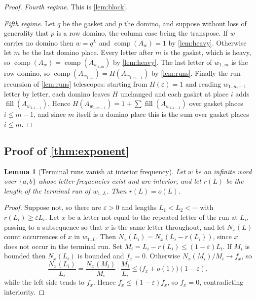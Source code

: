 \documentclass[11pt]{amsart}
\newtheorem{lemma}[theorem]{Lemma}
\theoremstyle{definition}
\theoremstyle{remark}
\DeclareMathOperator{\comp}{comp}
\DeclareMathOperator{\fil}{fill}
\begin{document}
\begin{proof}
\emph{Fourth regime.} This is \cref{lem:block}.

\emph{Fifth regime.} Let $q$ be the gasket and $p$ the domino, and suppose without loss of generality that $p$ is a row domino, the column case being the transpose. If $w$ carries no domino then $w = q^L$ and $\comp(A_w) = 1$ by \cref{lem:heavy}. Otherwise let $m$ be the last domino place. Every letter after $m$ is the gasket, which is heavy, so $\comp(A_w) = \comp(A_{w_{1..m}})$ by \cref{lem:heavy}. The last letter of $w_{1..m}$ is the row domino, so $\comp(A_{w_{1..m}}) = H(A_{w_{1..m-1}})$ by \cref{lem:runs}. Finally the run recursion of \cref{lem:runs} telescopes: starting from $H(\varepsilon) = 1$ and reading $w_{1..m-1}$ letter by letter, each domino leaves $H$ unchanged and each gasket at place $i$ adds $\fil(A_{w_{1..i-1}})$. Hence $H(A_{w_{1..m-1}}) = 1 + \sum \fil(A_{w_{1..i-1}})$ over gasket places $i \le m-1$, and since $m$ itself is a domino place this is the sum over gasket places $i \le m$.
\end{proof}

\subsection{Proof of \texorpdfstring{\cref{thm:exponent}}{the exponent theorem}}

\begin{lemma}[Terminal runs vanish at interior frequency]
\label{lem:terminal}
Let $w$ be an infinite word over $\{a,b\}$ whose letter frequencies exist and are interior, and let $r(L)$ be the length of the terminal run of $w_{1..L}$. Then $r(L) = o(L)$.
\end{lemma}

\begin{proof}
Suppose not, so there are $\varepsilon > 0$ and lengths $L_1 < L_2 < \cdots$ with $r(L_i) \ge \varepsilon L_i$. Let $x$ be a letter not equal to the repeated letter of the run at $L_i$, passing to a subsequence so that $x$ is the same letter throughout, and let $N_x(L)$ count occurrences of $x$ in $w_{1..L}$. Then $N_x(L_i) = N_x(L_i - r(L_i))$, since $x$ does not occur in the terminal run. Set $M_i = L_i - r(L_i) \le (1-\varepsilon) L_i$. If $M_i$ is bounded then $N_x(L_i)$ is bounded and $f_x = 0$. Otherwise $N_x(M_i)/M_i \to f_x$, so
\[
\frac{N_x(L_i)}{L_i} = \frac{N_x(M_i)}{M_i}\cdot\frac{M_i}{L_i} \le \bigl(f_x + o(1)\bigr)(1-\varepsilon),
\]
while the left side tends to $f_x$. Hence $f_x \le (1-\varepsilon) f_x$, so $f_x = 0$, contradicting interiority.
\end{proof}
\end{document}
